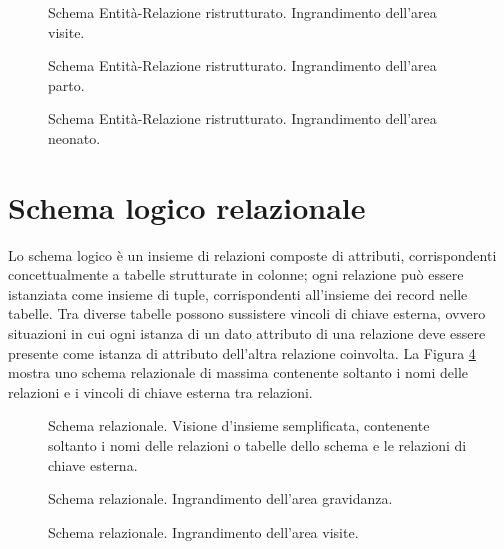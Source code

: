 \begin{figure}
    \centering
    
    \caption{Schema Entità-Relazione ristrutturato. Ingrandimento dell'area visite.}
\label{visitsrerdiagram}
\end{figure}

\begin{figure}
    \centering
    
    \caption{Schema Entità-Relazione ristrutturato. Ingrandimento dell'area parto.}
\label{deliveryrerdiagram}
\end{figure}

\begin{figure}
    \centering
    
    \caption{Schema Entità-Relazione ristrutturato. Ingrandimento dell'area neonato.}
\label{newbornrerdiagram}
\end{figure}

\newpage

\section{Schema logico relazionale}
\label{logical}

Lo schema logico è un insieme di relazioni composte di attributi, corrispondenti concettualmente a tabelle strutturate in colonne; ogni relazione può essere istanziata come insieme di tuple, corrispondenti all'insieme dei record nelle tabelle.
Tra diverse tabelle possono sussistere vincoli di chiave esterna, ovvero situazioni in cui ogni istanza di un dato attributo di una relazione deve essere presente come istanza di attributo dell'altra relazione coinvolta.
La Figura \ref{completereldiagram} mostra uno schema relazionale di massima contenente soltanto i nomi delle relazioni e i vincoli di chiave esterna tra relazioni.

\begin{figure}
    \centering
    
    \caption{Schema relazionale. Visione d'insieme semplificata, contenente soltanto i nomi delle relazioni o tabelle dello schema e le relazioni di chiave esterna.}
\label{completereldiagram}
\end{figure}

\begin{figure}
    \centering
    
    \caption{Schema relazionale. Ingrandimento dell'area gravidanza.}
\label{pregnancyreldiagram}
\end{figure}

\begin{figure}
    \centering
    
    \caption{Schema relazionale. Ingrandimento dell'area visite.}
\label{visitsreldiagram}
\end{figure}

